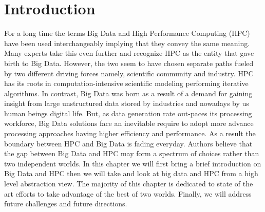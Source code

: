 \documentclass[runningheads,a4paper]{llncs}
\begin{document}
\section{Introduction}\label{sec:intro}
For a long time the terms Big Data and High Performance Computing (HPC) have been used interchangeably implying that they convey the same meaning. Many experts take this even further and recognize HPC as the entity that gave birth to Big Data. However, the two seem to have chosen separate paths fueled by two different driving forces namely, scientific community and industry. HPC has its roots in computation-intensive scientific modeling performing iterative algorithms. In contrast, Big Data was born as a result of a demand for gaining insight from large unstructured data stored by industries and nowadays by us human beings digital life. But, as data generation rate out-paces its processing workforce, Big Data solutions face an inevitable require to adopt more advance processing approaches having higher efficiency and performance.  As a result the boundary between HPC and Big Data is fading everyday. Authors believe that the gap between Big Data and HPC may form a spectrum of choices rather than two independent worlds. In this chapter we will first bring a brief introduction on Big Data and HPC then we will take and look at big data and HPC from a high level abstraction view. The majority of this chapter is dedicated to state of the art efforts to take advantage of the best of two worlds. Finally, we will address future challenges and future directions.\\
\end{document}
